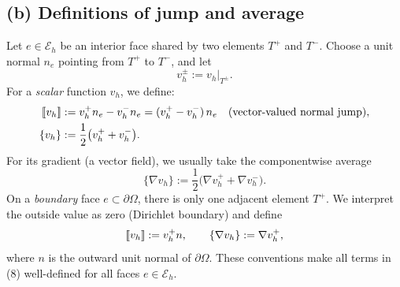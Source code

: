 \subsection*{(b) Definitions of jump and average}
Let $e\in\mathcal{E}_h$ be an interior face shared by two elements
$T^+$ and $T^-$. Choose a unit normal $n_e$ pointing from $T^+$ to $T^-$, and let
\[
    v_h^\pm := v_h\big|_{T^\pm}.
\]
For a \emph{scalar} function $v_h$, we define:
\begin{align*}
    \left[\!\left[ v_h \right]\!\right]
     & := v_h^+ n_e - v_h^- n_e
    = (v_h^+ - v_h^-)\,n_e \quad \text{(vector-valued normal jump)}, \\
    \{v_h\}
     & := \frac{1}{2}\big(v_h^+ + v_h^-\big).
\end{align*}
For its gradient (a vector field), we usually take the componentwise average
\[
    \{\nabla v_h\} := \frac{1}{2}\big(\nabla v_h^+ + \nabla v_h^-\big).
\]
On a \emph{boundary} face $e\subset\partial\Omega$, there is only one
adjacent element $T^+$.
We interpret the outside value as zero (Dirichlet boundary) and define
\[
    \left[\!\left[ v_h \right]\!\right] := v_h^+ n, \qquad
    \{\nabla v_h\} := \nabla v_h^+,
\]
where $n$ is the outward unit normal of $\partial\Omega$.
These conventions make all terms in (8) well-defined for all faces $e\in\mathcal{E}_h$.
